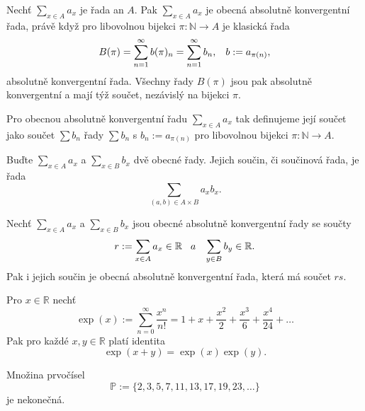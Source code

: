 \documentclass[../main.tex]{subfiles}
\begin{document}
\begin{theorem}
    Nechť $\sum_{x\in A} a_x$ je řada an $A$. Pak $\sum_{x\in A}a_x$ je obecná absolutně konvergentní řada, právě když
    pro libovolnou bijekci $\pi:\mathbb{N}\to A$ je klasická řada
    \[ B(\pi) = \sum_{n=1}^{\infty}b(\pi)_n = \sum_{n=1}^{\infty}b_n, \hspace{3mm} b := a_{\pi(n)}, \]
    absolutně konvergentní řada. Všechny řady $B(\pi)$ jsou pak absolutně konvergentní a mají týž součet, nezávislý na bijekci $\pi$.
\end{theorem}

\begin{definition}
    Pro obecnou absolutně konvergentní řadu $\sum_{x\in A}a_x$ tak definujeme její součet jako součet $\sum b_n$ řady $\sum b_n$ s $b_n := a_{\pi(n)}$
    pro libovolnou bijekci $\pi:\mathbb{N}\to A$.
\end{definition}

\begin{definition}
    Buďte $\sum_{x\in A} a_x$ a $\sum_{x\in B} b_x$ dvě obecné řady. Jejich součin, či součinová řada,
    je řada \[ \sum_{(a,b)\in A\times B} a_xb_x. \]
\end{definition}

\begin{theorem}
    Nechť $\sum_{x\in A} a_x$ a $\sum_{x\in B} b_x$ jsou obecné absolutně konvergentní řady se součty
    \[ r := \sum_{x\in A} a_x \in \mathbb{R} \hspace{3mm} a \hspace{3mm} \sum_{y\in B} b_y \in \mathbb{R}. \]
    Pak i jejich součin je obecná absolutně konvergentní řada, která má součet $rs$.
\end{theorem}

\begin{lemma}[Exponenciála]
    Pro $x\in \mathbb{R}$ nechť \[ \exp(x) := \sum_{n=0}^{\infty} \frac{x^n}{n!} = 1 + x + \frac{x^2}{2} + \frac{x^3}{6} + \frac{x^4}{24} + \dots \]
    Pak pro každé $x,y \in \mathbb{R}$ platí identita \[ \exp(x+y) = \exp(x)\exp(y). \]
\end{lemma}

\begin{lemma}
    Množina prvočísel
    \[ \mathbb{P} := \{ 2,3,5,7,11,13,17,19,23, \dots \} \]
    je nekonečná.
\end{lemma}
\end{document}
